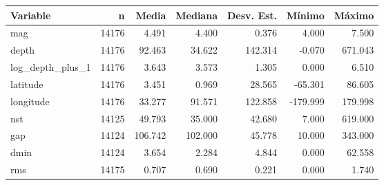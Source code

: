 \begin{tabular}{lrrrrrr}
\toprule
Variable & n & Media & Mediana & Desv. Est. & Mínimo & Máximo \\
\midrule
mag & 14176 & 4.491 & 4.400 & 0.376 & 4.000 & 7.500 \\
depth & 14176 & 92.463 & 34.622 & 142.314 & -0.070 & 671.043 \\
log\_depth\_plus\_1 & 14176 & 3.643 & 3.573 & 1.305 & 0.000 & 6.510 \\
latitude & 14176 & 3.451 & 0.969 & 28.565 & -65.301 & 86.605 \\
longitude & 14176 & 33.277 & 91.571 & 122.858 & -179.999 & 179.998 \\
nst & 14125 & 49.793 & 35.000 & 42.680 & 7.000 & 619.000 \\
gap & 14124 & 106.742 & 102.000 & 45.778 & 10.000 & 343.000 \\
dmin & 14124 & 3.654 & 2.284 & 4.844 & 0.000 & 62.558 \\
rms & 14175 & 0.707 & 0.690 & 0.221 & 0.000 & 1.740 \\
\bottomrule
\end{tabular}
